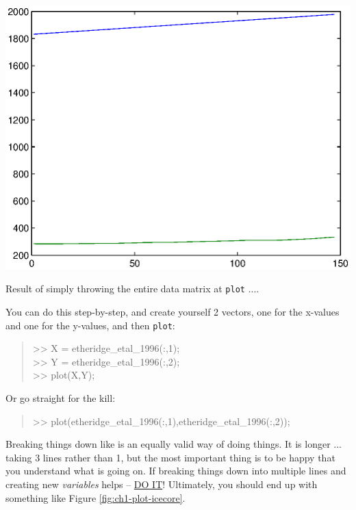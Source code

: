 \documentclass{tufte-book} %
\newenvironment{docspec}{\begin{quotation}\ttfamily\parskip0pt\parindent0pt\ignorespaces}{\end{quotation}}
\begin{document}
\begin{marginfigure}[-0.0in]
\includegraphics[width=\linewidth]{ch1-plot-icecore_default.eps}
\caption{Result of simply throwing the entire data matrix at \texttt{plot} ....}
\label{fig:ch1-plot-icecore_default}
\end{marginfigure}

You can do this step-by-step, and create yourself 2 vectors, one for the x-values and one for the y-values, and then \texttt{plot}:

\begin{docspec}
>> X = etheridge\_etal\_1996(:,1);\\
>> Y = etheridge\_etal\_1996(:,2);\\
>> plot(X,Y);
\end{docspec}

Or go straight for the kill:

\begin{docspec}
>> plot(etheridge\_etal\_1996(:,1),etheridge\_etal\_1996(:,2));
\end{docspec}

Breaking things down like  is an equally valid way of doing things. It is longer ... taking 3 lines rather than 1, but the most important thing is to be happy that you understand what is going on. If breaking things down into multiple lines and creating new \textit{variables} helps -- \uline{DO IT}! Ultimately, you should end up with something like Figure \ref{fig:ch1-plot-icecore}.
\end{document}
